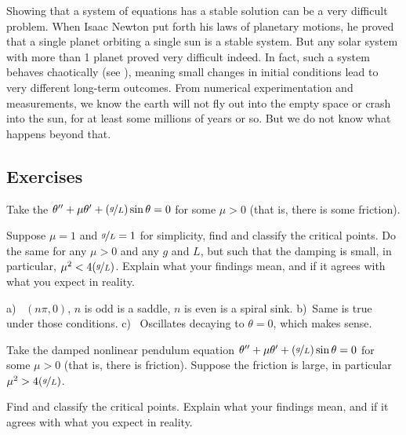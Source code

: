 Showing that a system of equations has a stable solution can be a very
difficult problem.  When Isaac Newton put forth his laws of
planetary motions, he proved that a single planet orbiting a single sun is a
stable system.  But any solar system with more than 1 planet proved very
difficult indeed.  In fact, such a system behaves chaotically (see 
), meaning small changes in initial conditions lead to very
different long-term outcomes.  From numerical experimentation and
measurements, we know the earth will not fly out into the empty space
or crash into the sun, for at least some millions of years or so.
But we do not know what happens beyond that.

\subsection{Exercises}

\begin{exercise}
Take the \emph{} $\theta '' + \mu \theta' +
(\nicefrac{g}{L})
\sin \theta = 0$ for some $\mu > 0$ (that is, there is some friction).
\begin{tasks}
\task
Suppose $\mu = 1$ and $\nicefrac{g}{L} = 1$ for simplicity, find and
classify the critical points.
\task
Do the same for any $\mu > 0$ and any $g$
and $L$, but such that the damping is small, in particular, $\mu^2 <
4(\nicefrac{g}{L})$.
\task
Explain what your findings mean, and if it agrees with what you
expect in reality.
\end{tasks}
\end{exercise}
\comboSol{%
}
{%
a)~ $(n\pi, 0)$, $n$ is odd is a saddle, $n$ is even is a spiral sink. \quad b)~Same is true under those conditions. \quad c)~ Oscillates decaying to $\theta = 0$, which makes sense.
}

\begin{exercise}\ansMark%
Take the damped nonlinear pendulum equation $\theta '' + \mu \theta' +
(\nicefrac{g}{L})
\sin \theta = 0$ for some $\mu > 0$ (that is, there is friction).
Suppose the friction is large, in particular $\mu^2 > 4 (\nicefrac{g}{L})$.
\begin{tasks}
\task
Find and classify the critical points.
\task
Explain what your findings mean, and if it agrees with what you
expect in reality.
\end{tasks}
\end{exercise}

